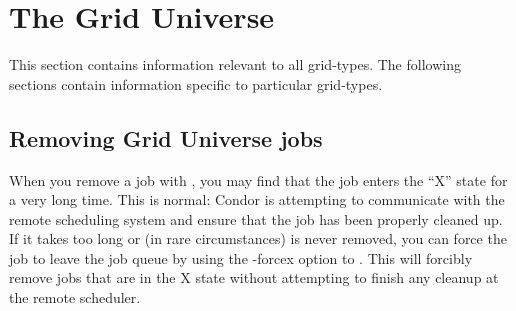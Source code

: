 \section{\label{sec:GridUniverse}The Grid Universe}




This section contains information relevant to all grid-types. The 
following sections contain information specific to particular grid-types.

\subsection{Removing Grid Universe jobs}

When you remove a job with , you may find that the job
enters the ``X'' state for a very long time. This is normal: Condor
is attempting to communicate with the remote scheduling system and
ensure that the job has been properly cleaned up. If it takes too long
or (in rare circumstances) is never removed, you can force the job to
leave the job queue by using the -forcex option to . This
will forcibly remove jobs that are in the X state without attempting
to finish any cleanup at the remote scheduler.



